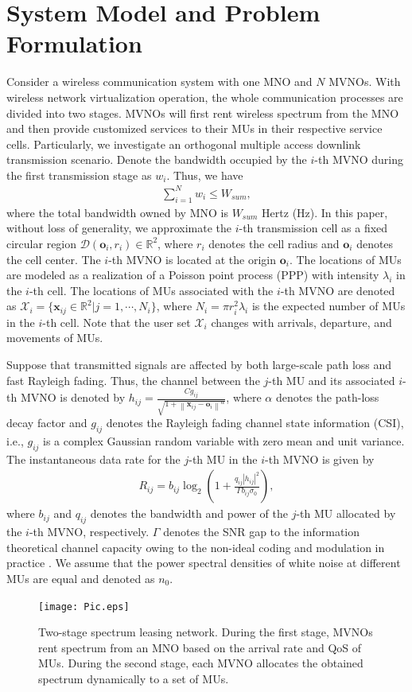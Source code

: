 \documentclass[journal]{IEEEtran}
\begin{document}
\section{System Model and Problem Formulation}
Consider a wireless communication system with one MNO and $N$ MVNOs. With wireless network virtualization operation, the whole communication processes are divided into two stages. MVNOs will first rent wireless spectrum from the MNO and then provide customized services to their MUs in their respective service cells. Particularly, we investigate an orthogonal multiple access downlink transmission scenario. Denote the bandwidth occupied by the $i$-th MVNO during the first transmission stage as $w_i$. Thus, we have
\begin{align}
\sum_{i = 1}^{N} w_i \leq W_{sum},
\end{align}
where the total bandwidth owned by MNO is $W_{sum}$ Hertz (Hz). In this paper, without loss of generality, we approximate the $i$-th transmission cell as a fixed circular region $\mathcal{D}(\mathbf{o}_i, r_i) \in \mathbb{R}^2$, where $r_i$ denotes the cell radius and $\mathbf{o}_i$ denotes the cell center. The $i$-th MVNO is located at the origin $\mathbf{o}_i$. The locations of MUs are modeled as a realization of a Poisson point process (PPP) with intensity $\lambda_i$ in the $i$-th cell. The locations of MUs associated with the $i$-th MVNO are denoted as $\mathcal{X}_i = \{\mathbf{x}_{ij} \in \mathbb{R}^2 | j = 1, \cdots, N_i\}$, where $N_i = \pi r_i^2 \lambda_i$ is the expected number of MUs in the $i$-th cell. Note that the user set $\mathcal{X}_i$ changes with arrivals, departure, and movements of MUs.

Suppose that transmitted signals are affected by both large-scale path loss and fast Rayleigh fading. Thus, the channel between the $j$-th MU and its associated $i$-th MVNO is denoted by $h_{ij} = \frac{C g_{ij}}{\sqrt{1 + {\left\| \mathbf{x}_{ij} - \mathbf{o}_i \right\|}^\alpha}}$, where $\alpha$ denotes the path-loss decay factor  and $g_{ij}$ denotes the Rayleigh fading channel state information (CSI), i.e., $g_{ij}$ is a complex Gaussian random variable with zero mean and unit variance. The instantaneous data rate for the $j$-th MU in the $i$-th MVNO is given by
\begin{align}
	R_{ij} = b_{ij}\log_2\left(1 + \frac{q_{ij} \left|h_{ij} \right|^2 }{\Gamma b_{ij}\sigma_0}\right),
\end{align}
where $b_{ij}$ and $q_{ij}$ denotes the bandwidth and power of the $j$-th MU allocated by the $i$-th MVNO, respectively. $\Gamma$ denotes the SNR gap to the information theoretical channel capacity owing to the
non-ideal coding and modulation in practice \cite{JGDForney}. We assume that the power spectral densities of white noise at different MUs are equal and denoted as $n_0$.                  
\begin{figure}
	\centering
	\texttt{[image: Pic.eps]}
	\caption{Two-stage spectrum leasing network. During the first stage, MVNOs rent spectrum from an MNO based on the arrival rate and QoS of MUs. During the second stage, each MVNO allocates the obtained spectrum dynamically to a set of MUs. }
\end{figure}
\end{document}
